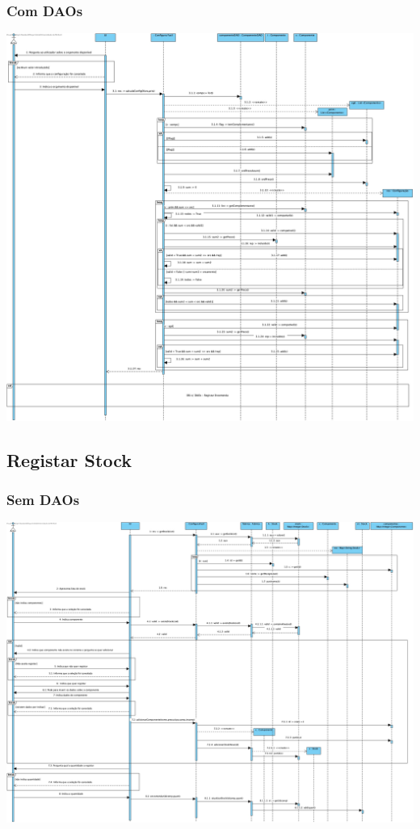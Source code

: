 \subsubsection{Com DAOs}
\begin{center}
 	\includegraphics[width = 5.5in]{DSI_D/DSI-DAOs-Configuracao_Otima.jpg}
\end{center}


\subsection{Registar Stock}
\subsubsection{Sem DAOs}
\begin{center}
 	\includegraphics[width = 5.5in]{DSI/DSI-Registar_Stock.jpg}
\end{center}

